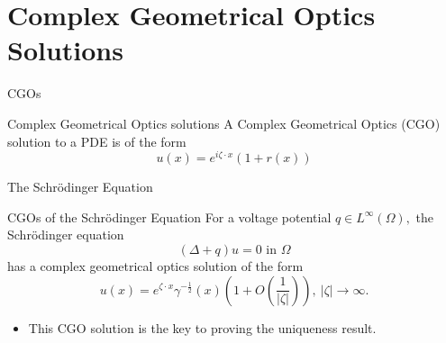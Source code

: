 \documentclass[12pt]{beamer}
\begin{document}
\section{Complex Geometrical Optics Solutions}
\begin{frame}{CGOs}
    \begin{block}{Complex Geometrical Optics solutions}
      A Complex Geometrical Optics (CGO) solution to a PDE is of the form \[u(x)=e^{i\zeta\cdot x}(1+r(x))\]  
    \end{block}
\end{frame}
\begin{frame}{The Schrödinger Equation}
    \begin{block}{CGOs of the Schrödinger Equation}
        For a voltage potential $q\in L^{\infty}(\Omega),$ the Schrödinger equation \[(\Delta+q)u=0\text{ in }\Omega\] has a complex geometrical optics solution of the form \[u(x)=e^{\zeta\cdot x}\gamma^{-\frac{1}{2}}(x)\left(1+O\left(\frac{1}{|\zeta|}\right)\right), \ |\zeta|\to\infty.\]
    \end{block}
    \pause
    \begin{itemize}
        \item This CGO solution is the key to proving the uniqueness result. 
    \end{itemize}
\end{frame}
\end{document}
